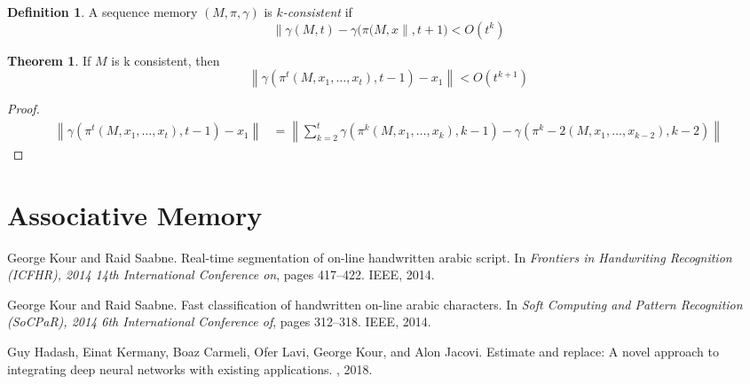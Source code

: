 \documentclass{article}
\theoremstyle{definition}
\newtheorem{definition}{Definition}[section]
\theoremstyle{theorem}
\newtheorem{theorem}{Theorem}[section]
\newcommand{\norm}[1]{\left\lVert#1\right\rVert}
\begin{document}
\begin{definition}
A sequence memory $(M, \pi, \gamma)$ is $k$\textit{-consistent} if 
\[
\norm{\gamma(M, t) - \gamma(\pi(M, x}, t+1) < O(t^k)
\]
\end{definition}

\begin{theorem}
If $M$ is k consistent, then
\[
\norm{\gamma(\pi^t(M, x_1, \dots, x_t), t - 1) - x_1} < O(t^{k+1})
\]
\end{theorem}

\begin{proof}
\begin{align*}
\norm{\gamma(\pi^t(M, x_1, \dots, x_t), t - 1) - x_1} &=
\norm{\sum_{k = 2}^t \gamma(\pi^k(M, x_1, \dots, x_k), k - 1) - \gamma(\pi^k-2(M, x_1, \dots, x_{k-2}), k - 2)}
\end{align*}
\end{proof}

\section{Associative Memory}




\begin{thebibliography}{1}

George Kour and Raid Saabne.
\newblock Real-time segmentation of on-line handwritten arabic script.
\newblock In {\em Frontiers in Handwriting Recognition (ICFHR), 2014 14th
  International Conference on}, pages 417--422. IEEE, 2014.

George Kour and Raid Saabne.
\newblock Fast classification of handwritten on-line arabic characters.
\newblock In {\em Soft Computing and Pattern Recognition (SoCPaR), 2014 6th
  International Conference of}, pages 312--318. IEEE, 2014.

Guy Hadash, Einat Kermany, Boaz Carmeli, Ofer Lavi, George Kour, and Alon
  Jacovi.
\newblock Estimate and replace: A novel approach to integrating deep neural
  networks with existing applications.
, 2018.

\end{thebibliography}
\end{document}
